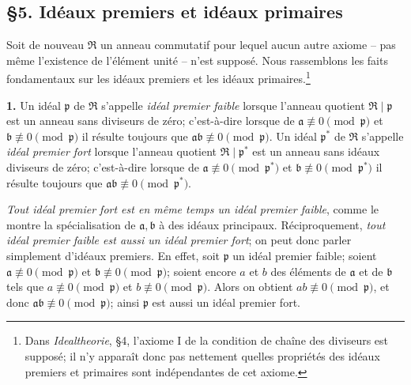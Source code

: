 \providecommand{\mR}{\mathfrak{R}}
\providecommand{\mT}{\mathfrak{T}}
\providecommand{\mA}{\mathfrak{A}}
\providecommand{\mB}{\mathfrak{B}}
\providecommand{\mC}{\mathfrak{C}}
\providecommand{\mD}{\mathfrak{D}}
\providecommand{\ma}{\mathfrak{a}}
\providecommand{\mb}{\mathfrak{b}}
\providecommand{\mc}{\mathfrak{c}}
\providecommand{\md}{\mathfrak{d}}
\providecommand{\mf}{\mathfrak{f}}
\providecommand{\mm}{\mathfrak{m}}
\providecommand{\mpideal}{\mathfrak{p}}
\providecommand{\mq}{\mathfrak{q}}

\subsection*{\S{}5. Idéaux premiers et idéaux primaires}

Soit de nouveau $\mR$ un anneau commutatif pour lequel aucun autre axiome -- pas même l'existence de l'élément unité -- n'est supposé. Nous rassemblons les faits fondamentaux sur les idéaux premiers et les idéaux primaires.\footnote{Dans \emph{Idealtheorie}, \S{}4, l'axiome I de la condition de chaîne des diviseurs est supposé; il n'y apparaît donc pas nettement quelles propriétés des idéaux premiers et primaires sont indépendantes de cet axiome.}

\textbf{1.} Un idéal $\mpideal$ de $\mR$ s'appelle \emph{idéal premier faible} lorsque l'anneau quotient $\mR\mid\mpideal$ est un anneau sans diviseurs de zéro; c'est-à-dire lorsque de $\ma\not\equiv0\pmod{\mpideal}$ et $\mb\not\equiv0\pmod{\mpideal}$ il résulte toujours que $\ma\mb\not\equiv0\pmod{\mpideal}$. Un idéal $\mpideal^*$ de $\mR$ s'appelle \emph{idéal premier fort} lorsque l'anneau quotient $\mR\mid\mpideal^*$ est un anneau sans idéaux diviseurs de zéro; c'est-à-dire lorsque de $\ma\not\equiv0\pmod{\mpideal^*}$ et $\mb\not\equiv0\pmod{\mpideal^*}$ il résulte toujours que $\ma\mb\not\equiv0\pmod{\mpideal^*}$.

\emph{Tout idéal premier fort est en même temps un idéal premier faible}, comme le montre la spécialisation de $\ma,\mb$ à des idéaux principaux. Réciproquement, \emph{tout idéal premier faible est aussi un idéal premier fort}; on peut donc parler simplement d'idéaux premiers. En effet, soit $\mpideal$ un idéal premier faible; soient $\ma\not\equiv0\pmod{\mpideal}$ et $\mb\not\equiv0\pmod{\mpideal}$; soient encore $a$ et $b$ des éléments de $\ma$ et de $\mb$ tels que $a\not\equiv0\pmod{\mpideal}$ et $b\not\equiv0\pmod{\mpideal}$. Alors on obtient $ab\not\equiv0\pmod{\mpideal}$, et donc $\ma\mb\not\equiv0\pmod{\mpideal}$; ainsi $\mpideal$ est aussi un idéal premier fort.

